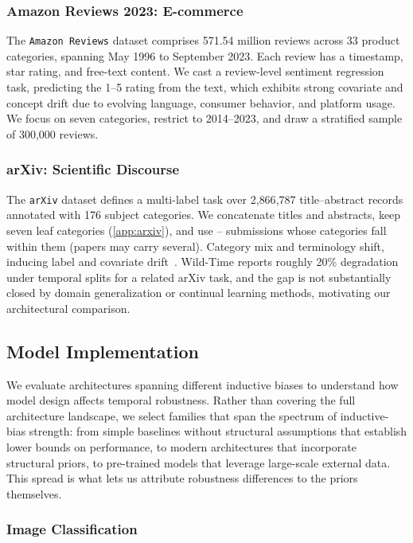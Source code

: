 \subsubsection{Amazon Reviews 2023: E-commerce}
The \texttt{Amazon Reviews} dataset \cite{hou2024bridging} comprises 571.54 million reviews across 33 product categories, spanning May 1996 to September 2023. Each review has a timestamp, star rating, and free-text content. We cast a review-level sentiment regression task, predicting the 1--5 rating from the text, which exhibits strong covariate and concept drift due to evolving language, consumer behavior, and platform usage. We focus on seven categories, restrict to 2014--2023, and draw a stratified sample of 300{,}000 reviews.

\subsubsection{arXiv: Scientific Discourse}
The \texttt{arXiv} dataset \cite{arxiv2024} defines a multi-label task over 2{,}866{,}787 title--abstract records annotated with 176 subject categories. We concatenate titles and abstracts, keep seven leaf categories (\cref{app:arxiv}), and use -- submissions whose categories fall within them (papers may carry several). Category mix and terminology shift, inducing label and covariate drift\iflncs\else\ \cite{holzinger2024analysis}\fi. Wild-Time \cite{yao2022wildtime} reports roughly 20\% degradation under temporal splits for a related arXiv task, and the gap is not substantially closed by domain generalization or continual learning methods, motivating our architectural comparison.

\subsection{Model Implementation}

We evaluate architectures spanning different inductive biases to understand how model design affects temporal robustness. Rather than covering the full architecture landscape, we select families that span the spectrum of inductive-bias strength: from simple baselines without structural assumptions that establish lower bounds on performance, to modern architectures that incorporate structural priors, to pre-trained models that leverage large-scale external data. This spread is what lets us attribute robustness differences to the priors themselves.

\subsubsection{Image Classification}


